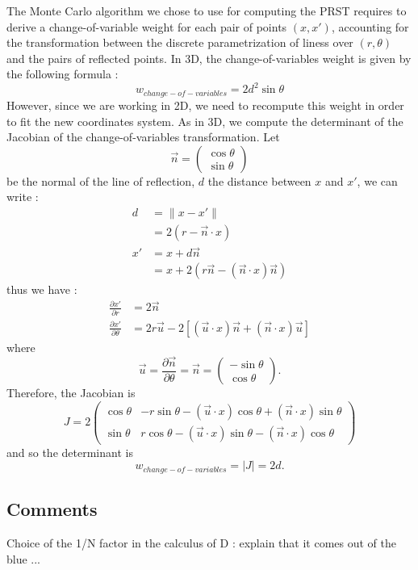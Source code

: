 \documentclass[10pt,a4paper]{article}			%
\begin{document}
The Monte Carlo algorithm we chose to use for computing the PRST requires to derive a change-of-variable weight for each pair of points $(x,x')$, accounting for the transformation between the discrete parametrization of liness over $(r,\theta)$ and the pairs of reflected points. In 3D, the change-of-variables weight is given by the following formula :
\[w_{change-of-variables} = 2d^2\sin\theta\]
However, since we are working in 2D, we need to recompute this weight in order to fit the new coordinates system. As in 3D, we compute the determinant of the Jacobian of the change-of-variables transformation. Let 
\[\vec{n}=\begin{pmatrix}\cos\theta \\ \sin\theta\end{pmatrix}\]
be the normal of the line of reflection, $d$ the distance between $x$ and $x'$, we can write :
\begin{align*}
 d & = \lVert x-x' \rVert  \\
& = 2(r-\vec{n}\cdot x) \\
x' &= x+ d\vec{n}\\
&= x+ 2(r\vec{n} - (\vec{n}\cdot x)\vec{n})
\end{align*}
thus we have :
\begin{align*}
\frac{\partial x'}{\partial r}&=2\vec{n}\\
\frac{\partial x'}{\partial \theta}&= 2r\vec{u}-2[(\vec{u}\cdot x)\vec{n}+(\vec{n}\cdot x)\vec{u}]
\end{align*}
where 
\[\vec{u}=\frac{\partial \vec{n}}{\partial \theta} = \vec{n}=\begin{pmatrix}-\sin\theta \\ \cos\theta\end{pmatrix}.\]
Therefore, the Jacobian is
\[J = 2
\begin{pmatrix}
\cos\theta & -r\sin\theta-(\vec{u}\cdot x)\cos\theta+(\vec{n}\cdot x)\sin\theta\\
\sin\theta &  r \cos\theta - (\vec{u}\cdot x)\sin\theta - (\vec{n}\cdot x)\cos\theta
\end{pmatrix}\]
and so the determinant is
\[w_{change-of-variables} = |J| = 2d.\]

  	\subsection{Comments}
  	Choice of the 1/N factor in the calculus of D : explain that it comes out of the blue ... \\
  	
\end{document}
